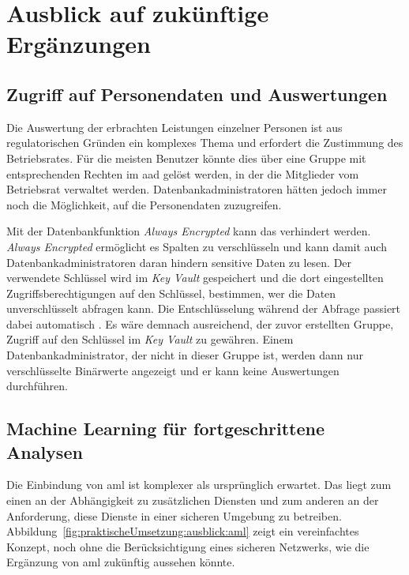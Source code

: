 \section{Ausblick auf zukünftige Ergänzungen} \label{sec:praktischeUmsetzung:ausblick}

\subsection{Zugriff auf Personendaten und Auswertungen}
Die Auswertung der erbrachten Leistungen einzelner Personen ist aus regulatorischen Gründen ein komplexes Thema und erfordert die Zustimmung des Betriebsrates. Für die meisten Benutzer könnte dies über eine Gruppe mit entsprechenden Rechten im \ac{aad} gelöst werden, in der die Mitglieder vom Betriebsrat verwaltet werden. Datenbankadministratoren hätten jedoch immer noch die Möglichkeit, auf die Personendaten zuzugreifen. 

Mit der Datenbankfunktion \textit{Always Encrypted} kann das verhindert werden. \textit{Always Encrypted} ermöglicht es Spalten zu verschlüsseln und kann damit auch Datenbankadministratoren daran hindern sensitive Daten zu lesen. Der verwendete Schlüssel wird im \textit{Key Vault} gespeichert und die dort eingestellten Zugriffsberechtigungen auf den Schlüssel, bestimmen, wer die Daten unverschlüsselt abfragen kann. Die Entschlüsselung während der Abfrage passiert dabei automatisch \cite{mauri_practical_2021}. Es wäre demnach ausreichend, der zuvor erstellten Gruppe, Zugriff auf den Schlüssel im \textit{Key Vault} zu gewähren. Einem Datenbankadministrator, der nicht in dieser Gruppe ist, werden dann nur verschlüsselte Binärwerte angezeigt und er kann keine Auswertungen durchführen.

\subsection{Machine Learning für fortgeschrittene Analysen}
\label{sec:praktischeUmsetzung:ausblick:aml}
Die Einbindung von \ac{aml} ist komplexer als ursprünglich erwartet. Das liegt zum einen an der Abhängigkeit zu zusätzlichen Diensten und zum anderen an der Anforderung, diese Dienste in einer sicheren Umgebung zu betreiben. Abbildung~\ref{fig:praktischeUmsetzung:ausblick:aml} zeigt ein vereinfachtes Konzept, noch ohne die Berücksichtigung eines sicheren Netzwerks, wie die Ergänzung von \ac{aml} zukünftig aussehen könnte.

